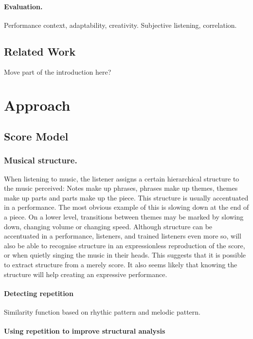 \documentclass[a4paper,10pt]{article}
\begin{document}
\paragraph*{Evaluation.} Performance context, adaptability, creativity. Subjective listening, correlation.

\subsection{Related Work}
Move part of the introduction here?
\section{Approach}

\subsection{Score Model}
\subsubsection{Musical structure.}
When listening to music, the listener assigns a certain hierarchical structure to the music perceived: Notes make up phrases, phrases make up themes, themes make up parts and parts make up the piece. This structure is usually accentuated in a performance. The most obvious example of this is slowing down at the end of a piece. On a lower level, transitions between themes may be marked by slowing down, changing volume or changing speed. Although structure can be accentuated in a performance, listeners, and trained listeners even more so, will also be able to recognise structure in an expressionless reproduction of the score, or when quietly singing the music in their heads. This suggests that it is possible to extract structure from a merely score. It also seems likely that knowing the structure will help creating an expressive performance.

\paragraph*{Detecting repetition}

Similarity function based on rhythic pattern and melodic pattern.

\paragraph*{Using repetition to improve structural analysis}
\end{document}
